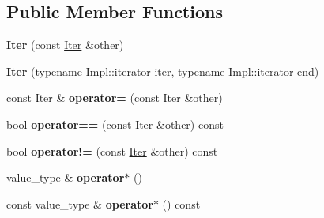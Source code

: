 \subsection*{Public Member Functions}
\begin{DoxyCompactItemize}
\item 
\hypertarget{classtheoria_1_1util_1_1densemap_1_1Iter_a750c06e8ecf8f5200e0bb8685d385e13}{{\bfseries Iter} (const \hyperlink{classtheoria_1_1util_1_1densemap_1_1Iter}{Iter} \&other)}\label{classtheoria_1_1util_1_1densemap_1_1Iter_a750c06e8ecf8f5200e0bb8685d385e13}

\item 
\hypertarget{classtheoria_1_1util_1_1densemap_1_1Iter_a796e7241e62ebbfbb3e87db3495e0672}{{\bfseries Iter} (typename Impl\+::iterator iter, typename Impl\+::iterator end)}\label{classtheoria_1_1util_1_1densemap_1_1Iter_a796e7241e62ebbfbb3e87db3495e0672}

\item 
\hypertarget{classtheoria_1_1util_1_1densemap_1_1Iter_a94ae1002beb5e2749b842b01f1e40a97}{const \hyperlink{classtheoria_1_1util_1_1densemap_1_1Iter}{Iter} \& {\bfseries operator=} (const \hyperlink{classtheoria_1_1util_1_1densemap_1_1Iter}{Iter} \&other)}\label{classtheoria_1_1util_1_1densemap_1_1Iter_a94ae1002beb5e2749b842b01f1e40a97}

\item 
\hypertarget{classtheoria_1_1util_1_1densemap_1_1Iter_a8a85230b81670d4f6ef3c4df3db42058}{bool {\bfseries operator==} (const \hyperlink{classtheoria_1_1util_1_1densemap_1_1Iter}{Iter} \&other) const }\label{classtheoria_1_1util_1_1densemap_1_1Iter_a8a85230b81670d4f6ef3c4df3db42058}

\item 
\hypertarget{classtheoria_1_1util_1_1densemap_1_1Iter_afe33e79134da282dbbd076cd1d6db1e4}{bool {\bfseries operator!=} (const \hyperlink{classtheoria_1_1util_1_1densemap_1_1Iter}{Iter} \&other) const }\label{classtheoria_1_1util_1_1densemap_1_1Iter_afe33e79134da282dbbd076cd1d6db1e4}

\item 
\hypertarget{classtheoria_1_1util_1_1densemap_1_1Iter_ae290045c043b2c9ea6ff17a91217cb04}{value\+\_\+type \& {\bfseries operator$\ast$} ()}\label{classtheoria_1_1util_1_1densemap_1_1Iter_ae290045c043b2c9ea6ff17a91217cb04}

\item 
\hypertarget{classtheoria_1_1util_1_1densemap_1_1Iter_a8470b158f6ac8dd45f200219f5e05b1d}{const value\+\_\+type \& {\bfseries operator$\ast$} () const }\label{classtheoria_1_1util_1_1densemap_1_1Iter_a8470b158f6ac8dd45f200219f5e05b1d}


\end{DoxyCompactItemize}
